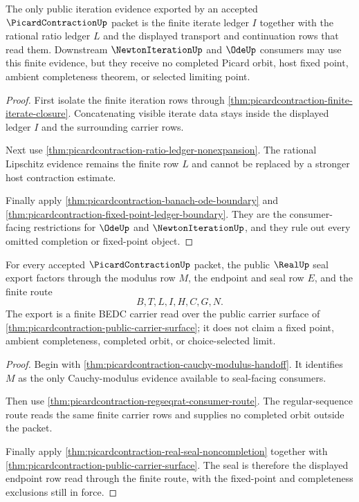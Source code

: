 \begin{theorem}
\label{thm:picardcontraction-public-iterate-ledger}
The only public iteration evidence exported by an accepted $\PicardContractionUp$ packet is the finite iterate ledger $I$ together with the rational ratio ledger $L$ and the displayed transport and continuation rows that read them. Downstream $\NewtonIterationUp$ and $\OdeUp$ consumers may use this finite evidence, but they receive no completed Picard orbit, host fixed point, ambient completeness theorem, or selected limiting point.
\end{theorem}
\begin{proof}
First isolate the finite iteration rows through \autoref{thm:picardcontraction-finite-iterate-closure}. Concatenating visible iterate data stays inside the displayed ledger $I$ and the surrounding carrier rows.

Next use \autoref{thm:picardcontraction-ratio-ledger-nonexpansion}. The rational Lipschitz evidence remains the finite row $L$ and cannot be replaced by a stronger host contraction estimate.

Finally apply \autoref{thm:picardcontraction-banach-ode-boundary} and \autoref{thm:picardcontraction-fixed-point-ledger-boundary}. They are the consumer-facing restrictions for $\OdeUp$ and $\NewtonIterationUp$, and they rule out every omitted completion or fixed-point object.
\end{proof}

\begin{theorem}
\label{thm:picardcontraction-public-seal-export}
For every accepted $\PicardContractionUp$ packet, the public $\RealUp$ seal export factors through the modulus row $M$, the endpoint and seal row $E$, and the finite route
$$
B,T,L,I,H,C,G,N.
$$
The export is a finite BEDC carrier read over the public carrier surface of \autoref{thm:picardcontraction-public-carrier-surface}; it does not claim a fixed point, ambient completeness, completed orbit, or choice-selected limit.
\end{theorem}
\begin{proof}
Begin with \autoref{thm:picardcontraction-cauchy-modulus-handoff}. It identifies $M$ as the only Cauchy-modulus evidence available to seal-facing consumers.

Then use \autoref{thm:picardcontraction-regseqrat-consumer-route}. The regular-sequence route reads the same finite carrier rows and supplies no completed orbit outside the packet.

Finally apply \autoref{thm:picardcontraction-real-seal-noncompletion} together with \autoref{thm:picardcontraction-public-carrier-surface}. The seal is therefore the displayed endpoint row read through the finite route, with the fixed-point and completeness exclusions still in force.
\end{proof}


